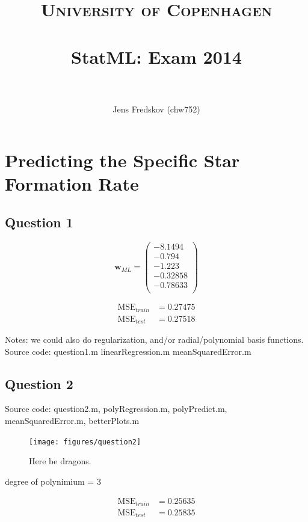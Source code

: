\documentclass[a4paper, 11pt]{article}
\title{ 
\normalfont\normalsize 
\textsc{University of Copenhagen} \\ [25pt]
\horrule{0.5pt} \\[0.4cm]
\huge StatML\@: Exam 2014\\
\horrule{2pt} \\[0.5cm]
}
\author{Jens Fredskov (chw752)}
\begin{document}
\maketitle
\pagebreak

\section{Predicting the Specific Star Formation Rate} %
\label{sec:predicting_the_specific_star_formation_rate}

\subsection*{Question 1}

\[
    \mathbf{w}_{\mathit{ML}} = \begin{pmatrix}
      -8.1494 \\
       -0.794 \\
       -1.223 \\
     -0.32858 \\
     -0.78633 \\
    \end{pmatrix}
\]

\begin{align*}
    \mathrm{MSE}_{\mathit{train}} &= 0.27475 \\
    \mathrm{MSE}_{\mathit{test}} &= 0.27518
\end{align*}

Notes: we could also do regularization, and/or radial/polynomial basis functions.
Source code: question1.m linearRegression.m meanSquaredError.m

\subsection*{Question 2}
Source code: question2.m, polyRegression.m, polyPredict.m, meanSquaredError.m, betterPlots.m

\begin{figure}[H]
    \centering
    \texttt{[image: figures/question2]}
    \caption{Here be dragons.}\label{fig:question2}
\end{figure}

degree of polynimium = 3

\begin{align*}
    \mathrm{MSE}_{\mathit{train}} &= 0.25635 \\
    \mathrm{MSE}_{\mathit{test}} &= 0.25835
\end{align*}
\end{document}
